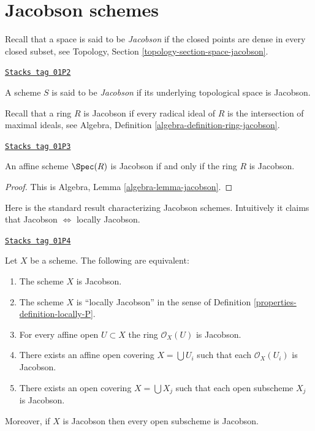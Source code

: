 \section{Jacobson schemes}
\label{properties-section-jacobson}
Recall that a space is said to be {\it Jacobson} if the closed points are
dense in every closed subset, see
Topology, Section \ref{topology-section-space-jacobson}.

\begin{definition}[Jacobson]
\label{properties-definition-jacobson}
\href{https://stacks.math.columbia.edu/tag/01P2}{\texttt{Stacks tag 01P2}}

A scheme $S$ is said to be {\it Jacobson} if its underlying topological
space is Jacobson.
\end{definition}

Recall that a ring $R$ is Jacobson if every radical ideal of $R$
is the intersection of maximal ideals, see
Algebra, Definition \ref{algebra-definition-ring-jacobson}.

\begin{lemma}
\label{properties-lemma-affine-jacobson}
\href{https://stacks.math.columbia.edu/tag/01P3}{\texttt{Stacks tag 01P3}}

An affine scheme $\Spec(R)$ is Jacobson if and only if
the ring $R$ is Jacobson.
\end{lemma}

\begin{proof}
This is Algebra, Lemma \ref{algebra-lemma-jacobson}.
\end{proof}

Here is the standard result characterizing Jacobson schemes.
Intuitively it claims that Jacobson $\Leftrightarrow$ locally Jacobson.

\begin{lemma}
\label{properties-lemma-locally-jacobson}
\href{https://stacks.math.columbia.edu/tag/01P4}{\texttt{Stacks tag 01P4}}

Let $X$ be a scheme. The following are equivalent:
\begin{enumerate}
\item The scheme $X$ is Jacobson.
\item The scheme $X$ is ``locally Jacobson'' in the sense of
Definition \ref{properties-definition-locally-P}.
\item For every affine open $U \subset X$ the ring $\mathcal{O}_X(U)$
is Jacobson.
\item There exists an affine open covering $X = \bigcup U_i$ such that
each $\mathcal{O}_X(U_i)$ is Jacobson.
\item There exists an open covering $X = \bigcup X_j$
such that each open subscheme $X_j$ is Jacobson.
\end{enumerate}
Moreover, if $X$ is Jacobson then every open subscheme
is Jacobson.
\end{lemma}


